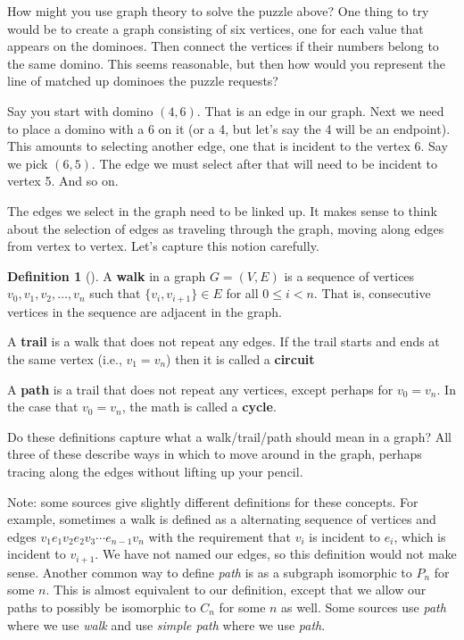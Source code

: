 \documentclass[10pt,]{book}
\newcommand{\terminology}[1]{\textbf{#1}}
\theoremstyle{plain}
\theoremstyle{definition}
\newtheorem{definition}[theorem]{Definition}
\theoremstyle{definition}
\theoremstyle{definition}
\numberwithin{equation}{chapter}
\newcommand{\lt}{<}
\begin{document}
\hypertarget{p-126}{}%
How might you use graph theory to solve the puzzle above?  One thing to try would be to create a graph consisting of six vertices, one for each value that appears on the dominoes.  Then connect the vertices if their numbers belong to the same domino.  This seems reasonable, but then how would you represent the line of matched up dominoes the puzzle requests?%
\par
\hypertarget{p-127}{}%
Say you start with domino \((4,6)\).  That is an edge in our graph.  Next we need to place a domino with a 6 on it (or a 4, but let's say the 4 will be an endpoint).  This amounts to selecting another edge, one that is incident to the vertex 6.  Say we pick \((6,5)\).  The edge we must select after that will need to be incident to vertex 5.  And so on.%
\par
\hypertarget{p-128}{}%
The edges we select in the graph need to be linked up.  It makes sense to think about the selection of edges as traveling through the graph, moving along edges from vertex to vertex.  Let's capture this notion carefully.%
\begin{definition}[{}]\label{def-walk}
\hypertarget{p-129}{}%
A \terminology{walk} in a graph \(G = (V,E)\) is a sequence of vertices \(v_0, v_1, v_2, \ldots, v_n\) such that \(\{v_i, v_{i+1}\} \in E\) for all \(0 \le i \lt n\).  That is, consecutive vertices in the sequence are adjacent in the graph.%
\par
\hypertarget{p-130}{}%
A \terminology{trail} is a walk that does not repeat any edges.  If the trail starts and ends at the same vertex (i.e., \(v_1 = v_n\)) then it is called a \terminology{circuit}%
\par
\hypertarget{p-131}{}%
A \terminology{path} is a trail that does not repeat any vertices, except perhaps for \(v_0 = v_n\).  In the case that \(v_0 = v_n\), the math is called a \terminology{cycle}.%
\end{definition}
\hypertarget{p-132}{}%
Do these definitions capture what a walk/trail/path should mean in a graph?  All three of these describe ways in which to move around in the graph, perhaps tracing along the edges without lifting up your pencil.%
\par
\hypertarget{p-133}{}%
Note: some sources give slightly different definitions for these concepts.  For example, sometimes a walk is defined as a alternating sequence of vertices and edges \(v_1e_1v_2e_2v_3\cdots e_{n-1}v_n\) with the requirement that \(v_i\) is incident to \(e_i\), which is incident to \(v_{i+1}\).  We have not named our edges, so this definition would not make sense.  Another common way to define \emph{path} is as a subgraph isomorphic to \(P_n\) for some \(n\).  This is almost equivalent to our definition, except that we allow our paths to possibly be isomorphic to \(C_n\) for some \(n\) as well.  Some sources use \emph{path} where we use \emph{walk} and use \emph{simple path} where we use \emph{path}.%
\end{document}

